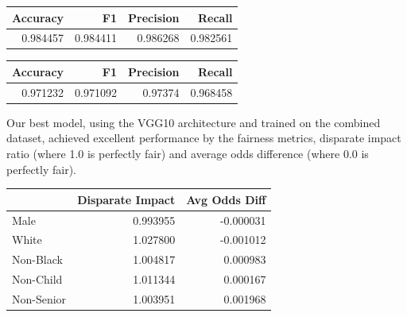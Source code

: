 \documentclass[11pt, letterpaper]{article}
\newenvironment{Figure}
  {\par\medskip\noindent\minipage{\linewidth}}
  {\endminipage\par\medskip}
\begin{document}
\begin{multicols}{2}
  \begin{Figure}
    \centering
    \label{vgg10-combined-metrics}
    \begin{tabular}{rrrr}
    \toprule
    Accuracy &        F1 &  Precision &    Recall \\
    \midrule
    0.984457 &  0.984411 &   0.986268 &  0.982561 \\
    \bottomrule
    \end{tabular}
  \end{Figure}

  \begin{Figure}
    \centering
    \label{vgg10-combined-fakefaces-metrics}
    \begin{tabular}{rrrr}
    \toprule
     Accuracy &        F1 &  Precision &    Recall \\
    \midrule
     0.971232 &  0.971092 &    0.97374 &  0.968458 \\
    \bottomrule
    \end{tabular}
    \end{Figure}

  Our best model, using the VGG10 architecture and trained on the combined
  dataset, achieved excellent performance by the fairness metrics, disparate
  impact ratio (where 1.0 is perfectly fair) and average odds difference
  (where 0.0 is perfectly fair).

    \begin{Figure}
      \centering
      \label{fairnessmetrics}
      \begin{tabular}{lrr}
      \toprule
      {} &  Disparate Impact &  Avg Odds Diff \\
      \midrule
      Male       &                0.993955 &                -0.000031 \\
      White      &                1.027800 &                -0.001012 \\
      Non-Black  &                1.004817 &                 0.000983 \\
      Non-Child  &                1.011344 &                 0.000167 \\
      Non-Senior &                1.003951 &                 0.001968 \\
      \bottomrule
      \end{tabular}
      \end{Figure}


\end{multicols}
\end{document}
